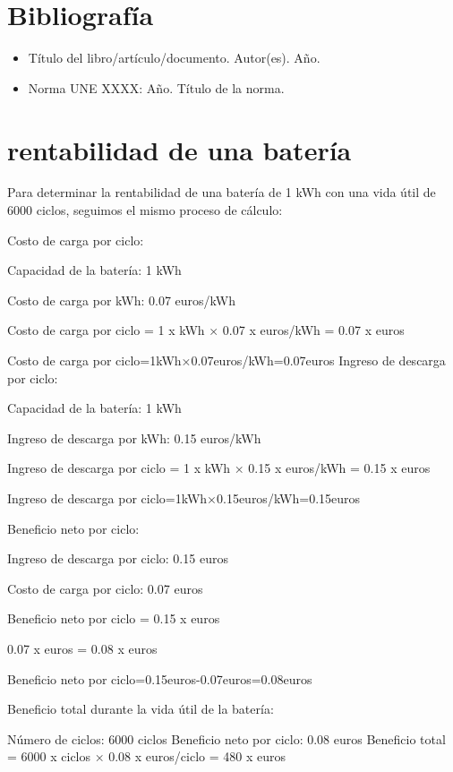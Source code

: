 \documentclass[a4paper,12pt]{article}
\begin{document}
\begin{Form}
\newpage
\section*{Bibliografía}
\begin{itemize}
    \item Título del libro/artículo/documento. Autor(es). Año.
    \item Norma UNE XXXX: Año. Título de la norma.
\end{itemize}



\section*{rentabilidad de una batería}



Para determinar la rentabilidad de una batería de 1 kWh con una vida útil de 6000 ciclos, seguimos el mismo proceso de cálculo:

Costo de carga por ciclo:

Capacidad de la batería: 1 kWh

Costo de carga por kWh: 0.07 euros/kWh

Costo de carga por ciclo
=
1
x
kWh
×
0.07
x
euros/kWh
=
0.07
x
euros

Costo de carga por ciclo=1kWh×0.07euros/kWh=0.07euros
Ingreso de descarga por ciclo:


Capacidad de la batería: 1 kWh

Ingreso de descarga por kWh: 0.15 euros/kWh

Ingreso de descarga por ciclo
=
1
x
kWh
×
0.15
x
euros/kWh
=
0.15
x
euros

Ingreso de descarga por ciclo=1kWh×0.15euros/kWh=0.15euros

Beneficio neto por ciclo:

Ingreso de descarga por ciclo: 0.15 euros

Costo de carga por ciclo: 0.07 euros

Beneficio neto por ciclo
=
0.15
x
euros

0.07
x
euros
=
0.08
x
euros

Beneficio neto por ciclo=0.15euros-0.07euros=0.08euros

Beneficio total durante la vida útil de la batería:

Número de ciclos: 6000 ciclos
Beneficio neto por ciclo: 0.08 euros
Beneficio total
=
6000
x
ciclos
×
0.08
x
euros/ciclo
=
480
x
euros




\end{Form}
\end{document}
